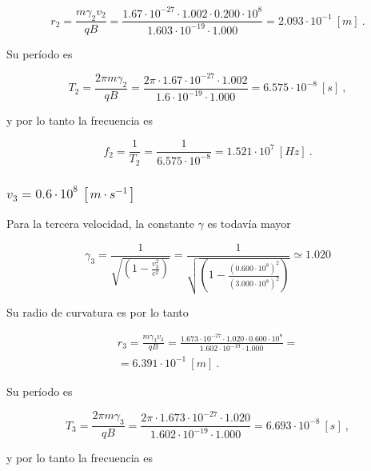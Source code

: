\documentclass[journal]{IEEEtran}
\begin{document}
\begin{equation}
r_2 = \displaystyle\frac{m\gamma_2v_2}{qB} = \displaystyle\frac{1.67\cdot 10^{-27}\cdot 1.002 \cdot 0.200\cdot 10^8}{1.603\cdot 10^{-19}\cdot 1.000} = 2.093\cdot 10^{-1}~[m]~.
\end{equation}

Su período es

\begin{equation}
T_2 = \displaystyle\frac{2\pi m\gamma_2}{qB} = \displaystyle\frac{2\pi \cdot 1.67\cdot 10^{-27}\cdot 1.002}{1.6\cdot 10^{-19}\cdot 1.000} = 6.575\cdot 10^{-8}~[s]~,
\end{equation}

y por lo tanto la frecuencia es

\begin{equation}
f_2 = \displaystyle\frac{1}{T_2} = \displaystyle\frac{1}{6.575\cdot 10^{-8}} = 1.521\cdot 10^7~[Hz]~.
\end{equation}


\subsubsection{$v_3 = 0.6\cdot 10^8~[m\cdot s^{-1}]$}

Para la tercera velocidad, la constante $\gamma$ es todavía mayor

\begin{equation}
\gamma_3 = \displaystyle\frac{1}{\sqrt{(1-\displaystyle\frac{v_3^2}{c^2})}} = \displaystyle\frac{1}{\sqrt{(1-\displaystyle\frac{(0.600\cdot 10^8)^2}{(3.000\cdot 10^8)^2})}} \simeq 1.020
\end{equation}

Su radio de curvatura es por lo tanto

\begin{align}
r_3 = \displaystyle\frac{m\gamma_3v_3}{qB} = \displaystyle\frac{1.673\cdot 10^{-27}\cdot 1.020 \cdot 0.600\cdot 10^8}{1.602\cdot 10^{-19}\cdot 1.000} = \\
= 6.391\cdot 10^{-1}~[m]~.
\end{align}

Su período es

\begin{equation}
    T_3 = \displaystyle\frac{2\pi m\gamma_3}{qB} = \displaystyle\frac{2\pi \cdot 1.673\cdot 10^{-27}\cdot 1.020}{1.602\cdot 10^{-19}\cdot 1.000} = 6.693\cdot 10^{-8}~[s]~,
\end{equation}

y por lo tanto la frecuencia es
\end{document}
